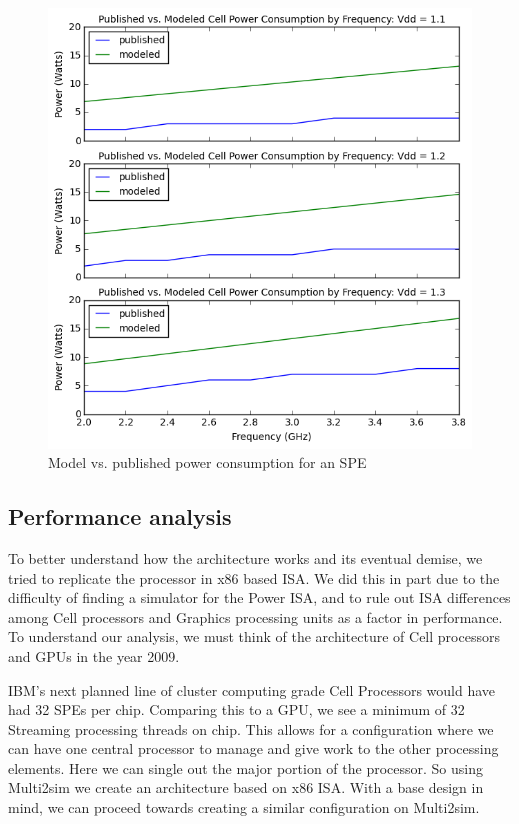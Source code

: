 \documentclass{sig-alternate-05-2015}
\begin{document}
\begin{figure}
\centering
\includegraphics{./spe-voltage-freq}
\caption{Model vs. published power consumption for an SPE}
\label{spe-voltage-freq}
\end{figure}

\subsection{Performance analysis}

To better understand how the architecture works and its eventual demise, we tried to replicate the processor in x86 based ISA. We did this in part due to the difficulty of finding a simulator for the Power ISA, and to rule out ISA differences among Cell processors and Graphics processing units as a factor in performance. To understand our analysis, we must think of the architecture of Cell processors and GPUs in the year 2009.  

IBM’s next planned line of cluster computing grade Cell Processors would have had 32 SPEs per chip. Comparing this to a GPU, we see a minimum of 32 Streaming processing threads on chip. This allows for a configuration where we can have one central processor to manage and give work to the other processing elements. Here we can single out the major portion of the processor. So using Multi2sim we create an architecture based on x86 ISA. With a base design in mind, we can proceed towards creating a similar configuration on Multi2sim. 
\end{document}
